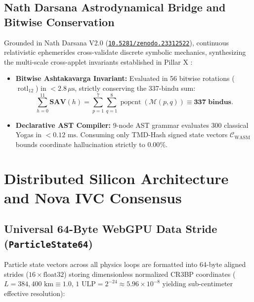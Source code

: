 \documentclass[11pt,a4paper,reqno]{article}
\theoremstyle{plain}
\theoremstyle{definition}
\theoremstyle{remark}
\numberwithin{equation}{section}
\numberwithin{table}{section}
\providecommand{\zenodo}[1]{\href{https://doi.org/10.5281/zenodo.#1}{\texttt{10.5281/zenodo.#1}}}
\begin{document}
\subsection{Nath Darsana Astrodynamical Bridge and Bitwise Conservation}
Grounded in Nath Darsana V2.0 \cite{NathDarsanaV2Monograph2026} (\zenodo{23312522}), continuous relativistic ephemerides cross-validate discrete symbolic mechanics, synthesizing the multi-scale cross-applet invariants established in Pillar X \cite{PillarXMonograph2026}:
\begin{itemize}
  \item \textbf{Bitwise Ashtakavarga Invariant:} Evaluated in 56 bitwise rotations ($\operatorname{rotl}_{12}$) in $< 2.8\,\mu\text{s}$, strictly conserving the 337-bindu sum:
  \begin{equation}
    \sum_{h=0}^{11} \mathbf{SAV}(h) = \sum_{p=1}^7 \sum_{q=1}^8 \operatorname{popcnt}(\mathcal{M}(p, q)) \equiv \mathbf{337\text{ bindus}}.
  \end{equation}
  \item \textbf{Declarative AST Compiler:} 9-node AST grammar evaluates 300 classical Yogas in $< 0.12\text{ ms}$. Consuming only TMD-Hash signed state vectors $\mathcal{C}_{\mathrm{WASM}}$ bounds coordinate hallucination strictly to $\bm{0.00\%}$.
\end{itemize}

\section{Distributed Silicon Architecture and Nova IVC Consensus}
\label{sec:silicon_architecture_nova}

\subsection{Universal 64-Byte WebGPU Data Stride (\texttt{ParticleState64})}
Particle state vectors across all physics loops are formatted into 64-byte aligned strides ($16 \times \text{float32}$) storing dimensionless normalized CR3BP coordinates ($L = 384{,}400\text{ km} \equiv 1.0$, $1\text{ ULP} = 2^{-24} \approx 5.96 \times 10^{-8}$ yielding sub-centimeter effective resolution):
\end{document}
